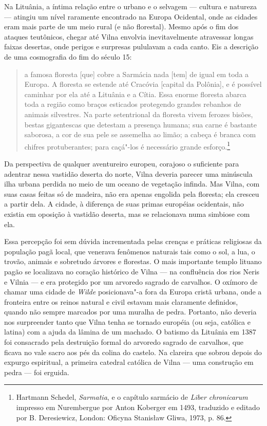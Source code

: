 %

Na Lituânia, a íntima relação entre o urbano e o selvagem --- cultura e
natureza --- atingiu um nível raramente encontrado na Europa Ocidental,
onde as cidades eram mais parte de um meio rural (e não florestal).
Mesmo após o fim dos ataques teutônicos, chegar até Vilna envolvia
inevitavelmente atravessar longas faixas desertas, onde perigos e
surpresas pululavam a cada canto. Eis a descrição de uma cosmografia do
fim do século 15:

\begin{quote}
a famosa floresta {[}que{]} cobre a Sarmácia nada {[}tem{]} de igual
em toda a Europa. A floresta se estende até Cracóvia {[}capital da
Polônia{]}, e é possível caminhar por ela até a Lituânia e a Cítia. Essa
enorme floresta abarca toda a região como braços esticados protegendo
grandes rebanhos de animais silvestres. Na parte setentrional da
floresta vivem ferozes bisões, bestas gigantescas que detestam a
presença humana; sua carne é bastante saborosa, a cor de sua pele se
assemelha ao limão; a cabeça é branca com chifres protuberantes; para
caçá"-los é necessário grande esforço.\footnote{Hartmann Schedel,
  \emph{Sarmatia}, e o capítulo sarmácio de \emph{Liber chronicarum}
  impresso em Nurembergue por Anton Koberger em 1493, traduzido e
  editado por B. Deresiewicz, London: Oficyna Stanisław Gliwa, 1973, p.
  86.}
\end{quote}

\asterisc

Da perspectiva de qualquer aventureiro europeu, corajoso o suficiente
para adentrar nessa vastidão deserta do norte, Vilna deveria parecer uma
minúscula ilha urbana perdida no meio de um oceano de vegetação infinda.
Mas Vilna, com suas casas feitas só de madeira, não era apenas engolida
pela floresta; ela cresceu a partir dela. A cidade, à diferença de suas
primas européias ocidentais, não existia em oposição à vastidão deserta,
mas se relacionava numa simbiose com ela.

Essa percepção foi sem dúvida incrementada pelas crenças e práticas
religiosas da população pagã local, que venerava fenômenos naturais tais
como o sol, a lua, o trovão, animais e sobretudo árvores e florestas. O
mais importante templo lituano pagão se localizava no coração histórico
de Vilna --- na confluência dos rios Neris e Vilnia --- e era protegido por
um arvoredo sagrado de carvalhos. O oxímoro de chamar uma cidade de
\emph{Wilde} posicionava"-a fora da Europa cristã urbana, onde a
fronteira entre os reinos natural e civil estavam mais claramente
definidos, quando não sempre marcados por uma muralha de pedra.
Portanto, não deveria nos surpreender tanto que Vilna tenha se tornado
européia (ou seja, católica e latina) com a ajuda da lâmina de um
machado. O batismo da Lituânia em 1387 foi consacrado pela destruição
formal do arvoredo sagrado de carvalhos, que ficava no vale sacro aos
pés da colina do castelo. Na clareira que sobrou depois do expurgo
espiritual, a primeira catedral católica de Vilna --- uma construção em
pedra --- foi erguida.

